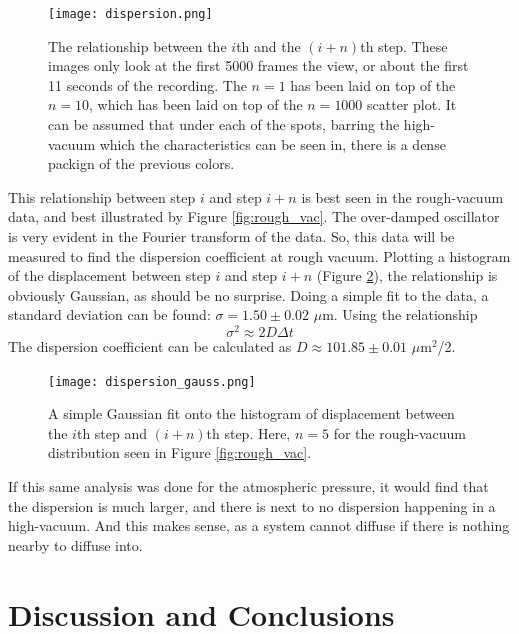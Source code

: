 \documentclass[12pt]{article}
\begin{document}
\begin{figure}
\texttt{[image: dispersion.png]}\
\caption{The relationship between the $i$th and the $(i+n)$th step. These images only look at the first 5000 frames the view, or about the first 11 seconds of the recording. The $n=1$ has been laid on top of the $n=10$, which has been laid on top of the $n=1000$ scatter plot. It can be assumed that under each of the spots, barring the high-vacuum which the characteristics can be seen in, there is a dense packign of the previous colors. }
\label{fig:dispersion}
\end{figure}

This relationship between step $i$ and step $i+n$ is best seen in the rough-vacuum data, and best illustrated by Figure \ref{fig:rough_vac}. The over-damped oscillator is very evident in the Fourier transform of the data. So, this data will be measured to find the dispersion coefficient at rough vacuum. Plotting a histogram of the displacement between step $i$ and step $i+n$ (Figure \ref{fig:gauss}), the relationship is obviously Gaussian, as should be no surprise. Doing a simple fit to the data, a standard deviation can be found: $\sigma = 1.50 \pm 0.02$ $\mu$m. Using the relationship
\[\sigma^2 \approx 2D \Delta t\]
The dispersion coefficient can be calculated as $D \approx 101.85 \pm 0.01$ $\mu$m$^2$/2. 

\begin{figure}
\texttt{[image: dispersion\_gauss.png]}\
\caption{A simple Gaussian fit onto the histogram of displacement between the $i$th step and $(i+n)$th step. Here, $n=5$ for the rough-vacuum distribution seen in Figure \ref{fig:rough_vac}.}
\label{fig:gauss}
\end{figure}

If this same analysis was done for the atmospheric pressure, it would find that the dispersion is much larger, and there is next to no dispersion happening in a high-vacuum. And this makes sense, as a system cannot diffuse if there is nothing nearby to diffuse into. 



\section{Discussion and Conclusions}
\end{document}
